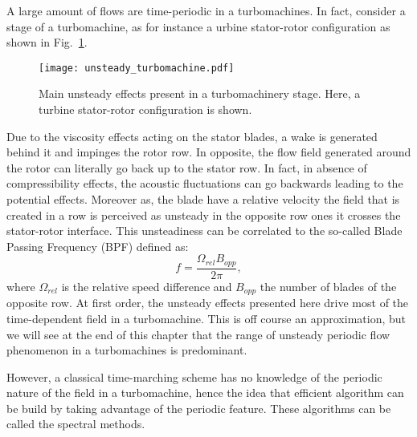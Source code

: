 
A large amount of flows are time-periodic in a turbomachines.
In fact, consider a stage of a turbomachine, as for instance
a urbine stator-rotor configuration as shown 
in Fig.~\ref{fig:sm_unsteady_turbomachine}. 
\begin{figure}[htbp]
  \centering
  \texttt{[image: unsteady\_turbomachine.pdf]}
  \caption{Main unsteady effects present in a turbomachinery stage. Here, a turbine stator-rotor
  configuration is shown.}
  \label{fig:sm_unsteady_turbomachine}
\end{figure}

Due to the
viscosity effects acting on the stator blades, 
a wake is generated behind it and 
impinges the rotor row. In opposite, the flow field
generated around the rotor can literally go back up
to the stator row. In fact, in absence of compressibility
effects, the acoustic fluctuations can go backwards leading
to the potential effects. Moreover as, the blade have a relative velocity
the field that is created in a row is perceived as unsteady in the opposite row
ones it crosses the stator-rotor interface. This unsteadiness can be
correlated to the so-called Blade Passing Frequency (BPF) defined as:
\begin{equation}
	f = \frac{\Omega_{rel} B_{opp}}{2 \pi},
\end{equation}
where $\Omega_{rel}$ is the relative speed difference 
and $B_{opp}$ the number of blades of the opposite row.
At first order, the unsteady effects presented here drive
most of the time-dependent field in a turbomachine. This 
is off course an approximation, but we will see at the end
of this chapter that the range of unsteady periodic
flow phenomenon in a turbomachines is predominant.

However, a classical time-marching scheme has no knowledge
of the periodic nature of the field in a turbomachine, hence
the idea that efficient algorithm can be build by taking advantage 
of the periodic feature. These algorithms can be called
the spectral methods.


